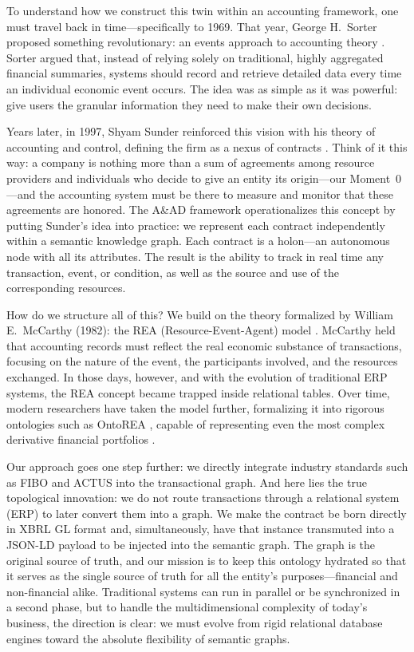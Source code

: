\documentclass[12pt, a4paper]{article}
\begin{document}
To understand how we construct this twin within an accounting framework, one must travel back in time---specifically to 1969. That year, George H.~Sorter proposed something revolutionary: an events approach to accounting theory \cite{sorter1969}. Sorter argued that, instead of relying solely on traditional, highly aggregated financial summaries, systems should record and retrieve detailed data every time an individual economic event occurs. The idea was as simple as it was powerful: give users the granular information they need to make their own decisions.

Years later, in 1997, Shyam Sunder reinforced this vision with his theory of accounting and control, defining the firm as a nexus of contracts \cite{sunder1997}. Think of it this way: a company is nothing more than a sum of agreements among resource providers and individuals who decide to give an entity its origin---our Moment~0---and the accounting system must be there to measure and monitor that these agreements are honored. The A\&AD framework operationalizes this concept by putting Sunder's idea into practice: we represent each contract independently within a semantic knowledge graph. Each contract is a holon---an autonomous node with all its attributes. The result is the ability to track in real time any transaction, event, or condition, as well as the source and use of the corresponding resources.

How do we structure all of this? We build on the theory formalized by William E.~McCarthy (1982): the REA (Resource-Event-Agent) model \cite{mccarthy1982}. McCarthy held that accounting records must reflect the real economic substance of transactions, focusing on the nature of the event, the participants involved, and the resources exchanged. In those days, however, and with the evolution of traditional ERP systems, the REA concept became trapped inside relational tables. Over time, modern researchers have taken the model further, formalizing it into rigorous ontologies such as OntoREA \cite{fischerpauzenberger2017}, capable of representing even the most complex derivative financial portfolios \cite{fischerpauzenberger2018}.

Our approach goes one step further: we directly integrate industry standards such as FIBO \cite{edmc2020} and ACTUS \cite{actus2018} into the transactional graph. And here lies the true topological innovation: we do not route transactions through a relational system (ERP) to later convert them into a graph. We make the contract be born directly in XBRL GL format and, simultaneously, have that instance transmuted into a JSON-LD payload to be injected into the semantic graph. The graph is the original source of truth, and our mission is to keep this ontology hydrated so that it serves as the single source of truth for all the entity's purposes---financial and non-financial alike. Traditional systems can run in parallel or be synchronized in a second phase, but to handle the multidimensional complexity of today's business, the direction is clear: we must evolve from rigid relational database engines toward the absolute flexibility of semantic graphs.
\end{document}
